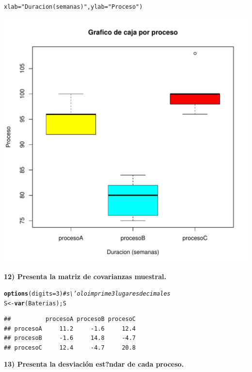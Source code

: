 \documentclass[12pt,letterpaper]{article}\usepackage[]{graphicx}\usepackage[]{color}
\makeatletter
\def\maxwidth{ %
  \ifdim\Gin@nat@width>\linewidth
    \linewidth
  \else
    \Gin@nat@width
  \fi
}
\newcommand{\hlnum}[1]{\textcolor[rgb]{0.686,0.059,0.569}{#1}}%
\newcommand{\hlstr}[1]{\textcolor[rgb]{0.192,0.494,0.8}{#1}}%
\newcommand{\hlcom}[1]{\textcolor[rgb]{0.678,0.584,0.686}{\textit{#1}}}%
\newcommand{\hlstd}[1]{\textcolor[rgb]{0.345,0.345,0.345}{#1}}%
\newcommand{\hlkwb}[1]{\textcolor[rgb]{0.69,0.353,0.396}{#1}}%
\newcommand{\hlkwc}[1]{\textcolor[rgb]{0.333,0.667,0.333}{#1}}%
\newcommand{\hlkwd}[1]{\textcolor[rgb]{0.737,0.353,0.396}{\textbf{#1}}}%
\newenvironment{kframe}{%
 \def\at@end@of@kframe{}%
 \ifinner\ifhmode%
  \def\at@end@of@kframe{\end{minipage}}%
  \begin{minipage}{\columnwidth}%
 \fi\fi%
 \def\FrameCommand##1{\hskip\@totalleftmargin \hskip-\fboxsep
 \colorbox{shadecolor}{##1}\hskip-\fboxsep
     \hskip-\linewidth \hskip-\@totalleftmargin \hskip\columnwidth}%
 \MakeFramed {\advance\hsize-\width
   \@totalleftmargin\z@ \linewidth\hsize
   \@setminipage}}%
 {\par\unskip\endMakeFramed%
 \at@end@of@kframe}
\newenvironment{knitrout}{}{} %
\makeatother
\begin{document}
\begin{knitrout}
\begin{kframe}
\begin{alltt}
\hlkwc{xlab} \hlstd{=}\hlstr{"Duracion (semanas)"}\hlstd{,} \hlkwc{ylab}\hlstd{=}\hlstr{"Proceso"}\hlstd{)}
\end{alltt}
\end{kframe}
\includegraphics[width=\maxwidth]{figure/unnamed-chunk-10-2} 

\end{knitrout}
\textbf{12) Presenta la matriz de covarianzas muestral.} 
\begin{knitrout}
\color{fgcolor}\begin{kframe}
\begin{alltt}
\hlkwd{options}\hlstd{(}\hlkwc{digits}\hlstd{=}\hlnum{3}\hlstd{)} \hlcom{# s\textbackslash{}'olo imprime 3 lugares decimales}
\hlstd{S} \hlkwb{<-} \hlkwd{var}\hlstd{(Baterias); S}
\end{alltt}
\begin{verbatim}
##          procesoA procesoB procesoC
## procesoA     11.2     -1.6     12.4
## procesoB     -1.6     14.8     -4.7
## procesoC     12.4     -4.7     20.8
\end{verbatim}
\end{kframe}
\end{knitrout}
\textbf{13) Presenta la desviaci\'on est?ndar de cada proceso.}  
\end{document}
